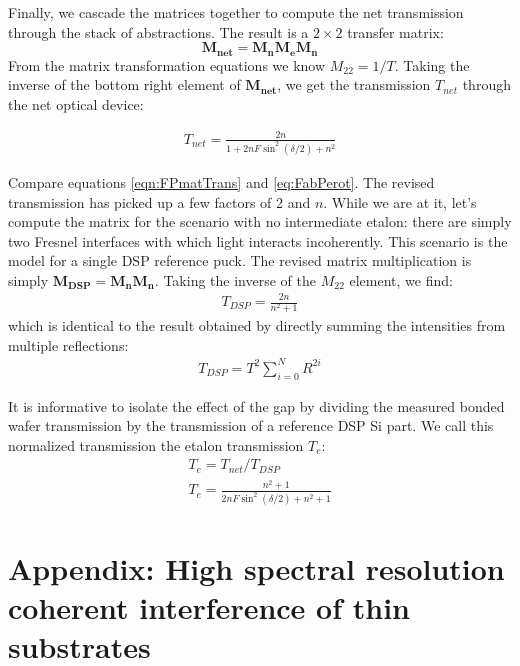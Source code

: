 \documentclass[osajnl,preprint,showpacs,superscriptaddress,12pt]{revtex4-1} %
\begin{document}
Finally, we cascade the matrices together to compute the net transmission through the stack of abstractions.  The result is a $2\times2$ transfer matrix: $$\boldsymbol{M_{net}}=\boldsymbol{M_n}\boldsymbol{M_e}\boldsymbol{M_n}$$  From the matrix transformation equations \cite{2007fuph.book.....S} we know $M_{22}=1/T$.  Taking the inverse of the bottom right element of $\boldsymbol{M_{net}}$, we get the transmission $T_{net}$ through the net optical device: 

\begin{eqnarray}
T_{net}=\frac{2 n}{1+ 2n F\sin ^2(\delta/2)+n^2} \label{eqn:FPmatTrans}
\end{eqnarray}

Compare equations \ref{eqn:FPmatTrans} and \ref{eq:FabPerot}.  The revised transmission has picked up a few factors of 2 and $n$.  While we are at it, let's compute the matrix for the scenario with no intermediate etalon: there are simply two Fresnel interfaces with which light interacts incoherently.  This scenario is the model for a single DSP reference puck. The revised matrix multiplication is simply $\boldsymbol{M_{DSP}}=\boldsymbol{M_n}\boldsymbol{M_n}$.  Taking the inverse of the $M_{22}$ element, we find: 
\begin{eqnarray}
T_{DSP}=\frac{2 n}{n^2+1}\label{eqn:EqofSummedSlab}
\end{eqnarray}
which is identical to the result obtained by directly summing the intensities from multiple reflections:
\begin{eqnarray}
T_{DSP}=T^2 \sum_{i=0}^{N}R^{2i} \label{eqn:multsum}
\end{eqnarray}

It is informative to isolate the effect of the gap by dividing the measured bonded wafer transmission by the transmission of a reference DSP Si part.  We call this normalized transmission the etalon transmission $T_{e}$:
\begin{eqnarray}
T_{e} = T_{net}/T_{DSP} \\
T_{e} = \frac{n^2+1}{2 n F \sin ^2(\delta/2)+n^2+1} \label{eqn:Tetalon}
\end{eqnarray}

\section{Appendix: High spectral resolution coherent interference of thin substrates}
\end{document}

